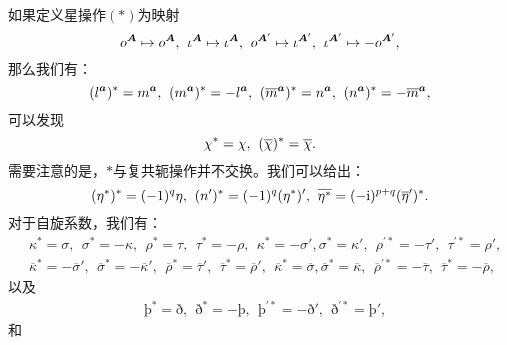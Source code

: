 如果定义星操作$( *)$为映射
\begin{equation*}
	o^{\boldsymbol{A}} \mapsto o^{\boldsymbol{A}} ,\kern+0.4em \iota ^{\boldsymbol{A}} \mapsto \iota ^{\boldsymbol{A}} ,\kern+0.4em o^{\boldsymbol{A} '} \mapsto \iota ^{\boldsymbol{A} '} ,\kern+0.4em \iota ^{\boldsymbol{A} '} \mapsto -o^{\boldsymbol{A} '} ,
\end{equation*}
那么我们有：
\begin{equation*}
	(l^{\boldsymbol{a}} )^{*} =m^{\boldsymbol{a}} ,\kern+0.4em (m^{\boldsymbol{a}} )^{*} =-l^{\boldsymbol{a}} ,\kern+0.4em (\overline{m}^{\boldsymbol{a}} )^{*} =n^{\boldsymbol{a}} ,\kern+0.4em (n^{\boldsymbol{a}} )^{*} =-\overline{m}^{\boldsymbol{a}} ,
\end{equation*}
可以发现
\begin{equation*}
	\chi ^{*} =\chi ,\kern+0.4em (\overline{\chi } )^{*} =\overline{\chi } .
\end{equation*}
需要注意的是，$*$与复共轭操作并不交换。我们可以给出：
\begin{equation*}
	(\eta ^{*} )^{*} =( -1)^{q} \eta ,\kern+0.4em (n')^{*} =( -1)^{q} (\eta ^{*} )',\kern+0.4em \overline{\eta ^{*}} =( -\mathrm{i})^{p+q} (\overline{\eta } ')^{*} .
\end{equation*}
对于自旋系数，我们有：
\begin{equation*}
	\begin{aligned}
		& \kappa ^{*} =\sigma ,\ \ \sigma ^{*} =-\kappa ,\ \ \rho ^{*} =\tau ,\ \ \tau ^{*} =-\rho ,\ \ \kappa ^{*} =-\sigma ',\sigma ^{*} =\kappa ',\ \ \rho ^{\prime *} =-\tau ',\ \ \tau ^{\prime *} =\rho ',\\
		& \overline{\kappa }^{*} =-\overline{\sigma } ',\ \ \overline{\sigma }^{*} =-\overline{\kappa } ',\ \ \overline{\rho }^{*} =\overline{\tau } ',\ \ \overline{\tau }^{*} =\overline{\rho } ',\ \ \overline{\kappa }^{*} =\overline{\sigma } ,\overline{\sigma }^{*} =\overline{\kappa } ,\ \ \overline{\rho } ^{\prime *} =-\overline{\tau } ,\ \ \overline{\tau }^{*} =-\overline{\rho } ,
	\end{aligned}
\end{equation*}
以及
\begin{equation*}
	\begin{aligned}
		& \text{þ}^{*} =\text{ð} ,\ \ \text{ð} ^{*} =-\text{þ},\ \ \text{þ}^{\prime *} =-\text{ð} ',\ \ \text{ð} ^{\prime *} =\text{þ}',
	\end{aligned}
\end{equation*}
和
